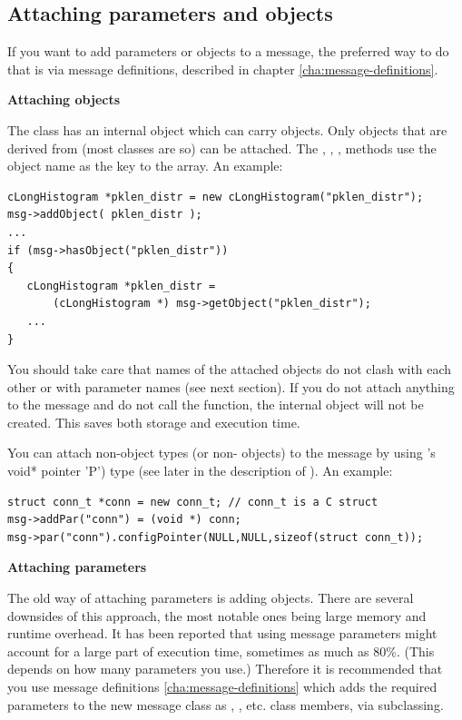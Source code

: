\subsection{Attaching parameters and objects}

If you want to add parameters or objects to a message, the preferred
way to do that is via message definitions, described in chapter
\ref{cha:message-definitions}.

\textbf{Attaching objects}

The  class has an internal  object which can
carry objects. Only objects
that are derived from  (most {\opp} classes are so) can be attached.
The , , ,
 methods use the object name
as the key to the array. An example:

\begin{verbatim}
cLongHistogram *pklen_distr = new cLongHistogram("pklen_distr");
msg->addObject( pklen_distr );
...
if (msg->hasObject("pklen_distr"))
{
   cLongHistogram *pklen_distr =
       (cLongHistogram *) msg->getObject("pklen_distr");
   ...
}
\end{verbatim}

You should take care that names of the attached objects do not
clash with each other or with  parameter names
(see next section).
If you do not attach anything to the message and do not call the
 function, the internal  object
will not be created.
This saves both storage and execution time.

You can attach non-object types (or non- objects) to
the message by using
's void* pointer 'P') type (see later in the description
of ). An example:

\begin{verbatim}
struct conn_t *conn = new conn_t; // conn_t is a C struct
msg->addPar("conn") = (void *) conn;
msg->par("conn").configPointer(NULL,NULL,sizeof(struct conn_t));
\end{verbatim}



\textbf{Attaching parameters}

The old way of attaching parameters is adding  objects.
There are several downsides of this approach, the most notable ones
being large memory and runtime overhead. It has been reported that
using  message parameters might account for a large
part of execution time, sometimes as much as 80\%. (This depends
on how many parameters you use.) Therefore it is recommended
that you use message definitions \ref{cha:message-definitions}
which adds the required parameters to the new message class
as , ,  etc. class members, via
subclassing.

